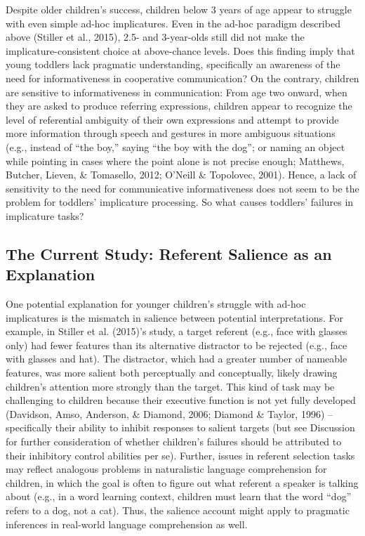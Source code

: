 \documentclass[man]{apa6}
\theoremstyle{definition}
\theoremstyle{definition}
\theoremstyle{definition}
\theoremstyle{remark}
\begin{document}
Despite older children's success, children below 3 years of age appear
to struggle with even simple ad-hoc implicatures. Even in the ad-hoc
paradigm described above (Stiller et al., 2015), 2.5- and 3-year-olds
still did not make the implicature-consistent choice at above-chance
levels. Does this finding imply that young toddlers lack pragmatic
understanding, specifically an awareness of the need for informativeness
in cooperative communication? On the contrary, children are sensitive to
informativeness in communication: From age two onward, when they are
asked to produce referring expressions, children appear to recognize the
level of referential ambiguity of their own expressions and attempt to
provide more information through speech and gestures in more ambiguous
situations (e.g., instead of ``the boy,'' saying ``the boy with the
dog''; or naming an object while pointing in cases where the point alone
is not precise enough; Matthews, Butcher, Lieven, \& Tomasello, 2012;
O'Neill \& Topolovec, 2001). Hence, a lack of sensitivity to the need
for communicative informativeness does not seem to be the problem for
toddlers' implicature processing. So what causes toddlers' failures in
implicature tasks?

\subsection{The Current Study: Referent Salience as an
Explanation}\label{the-current-study-referent-salience-as-an-explanation}

One potential explanation for younger children's struggle with ad-hoc
implicatures is the mismatch in salience between potential
interpretations. For example, in Stiller et al. (2015)'s study, a target
referent (e.g., face with glasses only) had fewer features than its
alternative distractor to be rejected (e.g., face with glasses and hat).
The distractor, which had a greater number of nameable features, was
more salient both perceptually and conceptually, likely drawing
children's attention more strongly than the target. This kind of task
may be challenging to children because their executive function is not
yet fully developed (Davidson, Amso, Anderson, \& Diamond, 2006; Diamond
\& Taylor, 1996) -- specifically their ability to inhibit responses to
salient targets (but see Discussion for further consideration of whether
children's failures should be attributed to their inhibitory control
abilities per se). Further, issues in referent selection tasks may
reflect analogous problems in naturalistic language comprehension for
children, in which the goal is often to figure out what referent a
speaker is talking about (e.g., in a word learning context, children
must learn that the word \enquote{dog} refers to a dog, not a cat).
Thus, the salience account might apply to pragmatic inferences in
real-world language comprehension as well.
\end{document}
